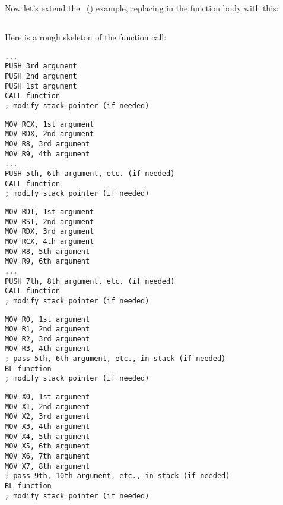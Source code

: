 \section{\PrintfSeveralArgumentsSectionName}

Now let's extend the \IT{\HelloWorldSectionName}~() example, replacing \printf in
the \main function body with this:







\subsection{\Conclusion{}}

Here is a rough skeleton of the function call:

\begin{lstlisting}[caption=x86,style=customasmx86]
...
PUSH 3rd argument
PUSH 2nd argument
PUSH 1st argument
CALL function
; modify stack pointer (if needed)
\end{lstlisting}

\begin{lstlisting}[caption=x64 (MSVC),style=customasmx86]
MOV RCX, 1st argument
MOV RDX, 2nd argument
MOV R8, 3rd argument
MOV R9, 4th argument
...
PUSH 5th, 6th argument, etc. (if needed)
CALL function
; modify stack pointer (if needed)
\end{lstlisting}

\begin{lstlisting}[caption=x64 (GCC),style=customasmx86]
MOV RDI, 1st argument
MOV RSI, 2nd argument
MOV RDX, 3rd argument
MOV RCX, 4th argument
MOV R8, 5th argument
MOV R9, 6th argument
...
PUSH 7th, 8th argument, etc. (if needed)
CALL function
; modify stack pointer (if needed)
\end{lstlisting}

\begin{lstlisting}[caption=ARM,style=customasmARM]
MOV R0, 1st argument
MOV R1, 2nd argument
MOV R2, 3rd argument
MOV R3, 4th argument
; pass 5th, 6th argument, etc., in stack (if needed)
BL function
; modify stack pointer (if needed)
\end{lstlisting}

\begin{lstlisting}[caption=ARM64,style=customasmARM]
MOV X0, 1st argument
MOV X1, 2nd argument
MOV X2, 3rd argument
MOV X3, 4th argument
MOV X4, 5th argument
MOV X5, 6th argument
MOV X6, 7th argument
MOV X7, 8th argument
; pass 9th, 10th argument, etc., in stack (if needed)
BL function
; modify stack pointer (if needed)
\end{lstlisting}

